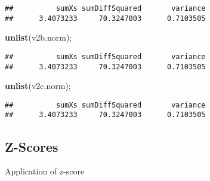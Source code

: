 \documentclass[
]{article}
\newenvironment{Shaded}{\begin{snugshade}}{\end{snugshade}}
\newcommand{\KeywordTok}[1]{\textcolor[rgb]{0.13,0.29,0.53}{\textbf{#1}}}
\newcommand{\NormalTok}[1]{#1}
\begin{document}
\begin{verbatim}
##          sumXs sumDiffSquared       variance 
##      3.4073233     70.3247003      0.7103505
\end{verbatim}

\begin{Shaded}
\begin{Highlighting}[]
\KeywordTok{unlist}\NormalTok{(v2b.norm);}
\end{Highlighting}
\end{Shaded}

\begin{verbatim}
##          sumXs sumDiffSquared       variance 
##      3.4073233     70.3247003      0.7103505
\end{verbatim}

\begin{Shaded}
\begin{Highlighting}[]
\KeywordTok{unlist}\NormalTok{(v2c.norm);}
\end{Highlighting}
\end{Shaded}

\begin{verbatim}
##          sumXs sumDiffSquared       variance 
##      3.4073233     70.3247003      0.7103505
\end{verbatim}

\hypertarget{z-scores}{%
\subsection{Z-Scores}\label{z-scores}}

Application of z-score
\end{document}

